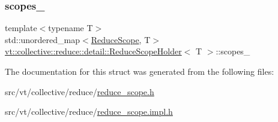 \mbox{\label{structvt_1_1collective_1_1reduce_1_1detail_1_1_reduce_scope_holder_a71e4ba9dc78528dd93e253f4ff24e0e4}} 
\subsubsection{\texorpdfstring{scopes\+\_\+}{scopes\_}}
{\footnotesize\ttfamily template$<$typename T$>$ \\
std\+::unordered\+\_\+map$<$\hyperlink{structvt_1_1collective_1_1reduce_1_1detail_1_1_reduce_scope}{Reduce\+Scope}, T$>$ \hyperlink{structvt_1_1collective_1_1reduce_1_1detail_1_1_reduce_scope_holder}{vt\+::collective\+::reduce\+::detail\+::\+Reduce\+Scope\+Holder}$<$ T $>$\+::scopes\+\_\+\hspace{0.3cm}{\ttfamily [private]}}



The documentation for this struct was generated from the following files\+:\begin{DoxyCompactItemize}
\item 
src/vt/collective/reduce/\hyperlink{reduce__scope_8h}{reduce\+\_\+scope.\+h}\item 
src/vt/collective/reduce/\hyperlink{reduce__scope_8impl_8h}{reduce\+\_\+scope.\+impl.\+h}\end{DoxyCompactItemize}
